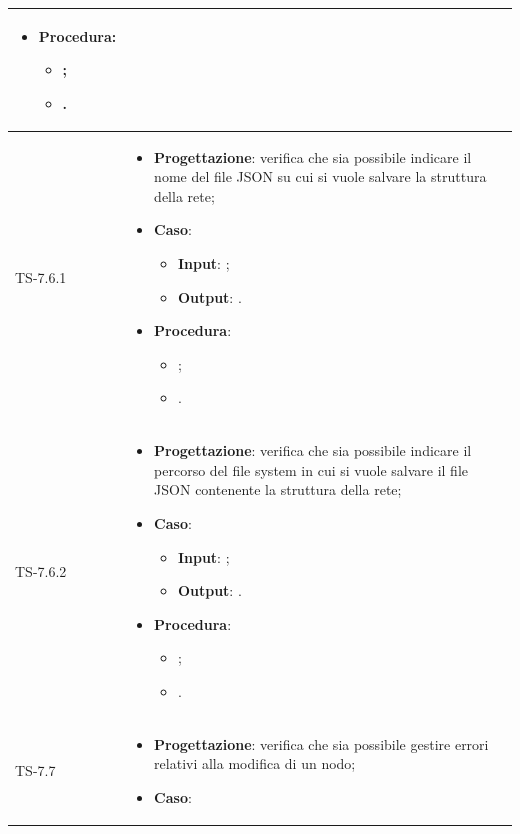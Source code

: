 \begin{longtable}{|C{2.5cm}|C{13cm}|}
\begin{itemize}
	\item \textbf{Procedura}:
	\begin{itemize}
		\item ;
		\item .
	\end{itemize} 
\end{itemize}
	 \\
	\hline
	{TS-7.6.1} & 
\begin{itemize}
	\item \textbf{Progettazione}: verifica che sia possibile indicare il nome
	del file JSON su cui si vuole salvare la struttura della rete;
	\item \textbf{Caso}: 
	\begin{itemize}
		\item \textbf{Input}: ;
		\item \textbf{Output}: .
	\end{itemize}
	\item \textbf{Procedura}:
	\begin{itemize}
		\item ;
		\item .
	\end{itemize} 
\end{itemize}
	 \\
	\hline
	{TS-7.6.2} &
\begin{itemize}
	\item \textbf{Progettazione}: verifica che sia possibile indicare il
	percorso del file system in cui si vuole salvare il file JSON contenente la
	struttura della rete;
	\item \textbf{Caso}: 
	\begin{itemize}
		\item \textbf{Input}: ;
		\item \textbf{Output}: .
	\end{itemize}
	\item \textbf{Procedura}:
	\begin{itemize}
		\item ;
		\item .
	\end{itemize} 
\end{itemize}
	  \\
	\hline
	{TS-7.7} & 
\begin{itemize}
	\item \textbf{Progettazione}: verifica che sia possibile gestire errori
	relativi alla modifica di un nodo;
	\item \textbf{Caso}: 
	\begin{itemize}

\end{itemize}
\end{itemize}
\end{longtable}
